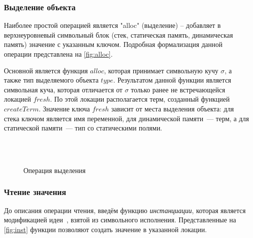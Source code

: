 \subsubsection{Выделение объекта}
Наиболее простой операцией является "alloc" (выделение) -- добавляет в верхнеуровневый символьный блок (стек, статическая память, динамическая память) значение с указанным ключом. Подробная формализация данной операции представлена на \autoref{fig:alloc}.

Основной является функция $alloc$, которая принимает символьную кучу $\sigma$, а также тип выделяемого объекта $type$. Результатом данной функции является символьная куча, которая отличается от $\sigma$ только ранее не встречающейся локацией $fresh$. По этой локации располагается терм, созданный функцией $createTerm$. Значение ключа $fresh$ зависит от места выделения объекта: для стека ключом является имя переменной, для динамической памяти~--- терм, а для статической памяти~--- тип со статическими полями.

\begin{figure}[H]
\centering
\tiny
\setlength{\jot}{1pt}
\begin{mymathbox}
 \\
 \\
\end{mymathbox}
\normalsize
\caption{Операция выделения} \label{fig:alloc}
\end{figure}

\subsubsection{Чтение значения}

До описания операции чтения, введём функцию \emph{инстанциации}, которая является модификацией идеи~\cite{khurshid2003generalized}, взятой из символьного исполнения. Представленные на \autoref{fig:inst} функции позволяют создать значение в указанной локации.

